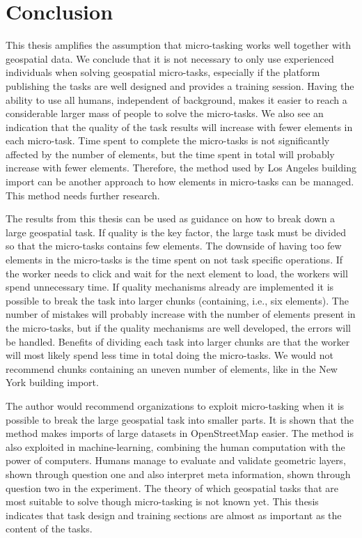 \chapter{Conclusion}

This thesis amplifies the assumption that micro-tasking works well together with geospatial data. We conclude that it is not necessary to only use experienced individuals when solving geospatial micro-tasks, especially if the platform publishing the tasks are well designed and provides a training session. Having the ability to use all humans, independent of background, makes it easier to reach a considerable larger mass of people to solve the micro-tasks. We also see an indication that the quality of the task results will increase with fewer elements in each micro-task. Time spent to complete the micro-tasks is not significantly affected by the number of elements, but the time spent in total will probably increase with fewer elements. Therefore, the method used by Los Angeles building import can be another approach to how elements in micro-tasks can be managed. This method needs further research.

The results from this thesis can be used as guidance on how to break down a large geospatial task. If quality is the key factor, the large task must be divided so that the micro-tasks contains few elements. The downside of having too few elements in the micro-tasks is the time spent on not task specific operations. If the worker needs to click and wait for the next element to load, the workers will spend unnecessary time. If quality mechanisms already are implemented it is possible to break the task into larger chunks (containing, i.e., six elements). The number of mistakes will probably increase with the number of elements present in the micro-tasks, but if the quality mechanisms are well developed, the errors will be handled. Benefits of dividing each task into larger chunks are that the worker will most likely spend less time in total doing the micro-tasks. We would not recommend chunks containing an uneven number of elements, like in the New York building import. 

The author would recommend organizations to exploit micro-tasking when it is possible to break the large geospatial task into smaller parts. It is shown that the method makes imports of large datasets in OpenStreetMap easier. The method is also exploited in machine-learning, combining the human computation with the power of computers. Humans manage to evaluate and validate geometric layers, shown through question one and also interpret meta information, shown through question two in the experiment. The theory of which geospatial tasks that are most suitable to solve though micro-tasking is not known yet. This thesis indicates that task design and training sections are almost as important as the content of the tasks.


